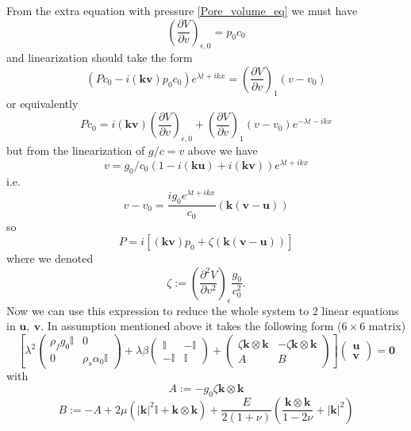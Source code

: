\documentclass[12pt]{article}
\numberwithin{theorem}{section}
\newcommand{\pp}[2]{\frac{\partial #1}{\partial #2}}
\begin{document}
From the extra equation with pressure \eqref{Pore_volume_eq} we must have
\[\left(\pp{V}{v}\right)_{\epsilon, 0} = p_0 c_0\]
and linearization should take the form
\[(Pc_0 - i(\mathbf{kv})p_0c_0)e^{\lambda t + ikx} = \left(\pp{V}{v}\right)_1 (v - v_0)\] or equivalently
\[Pc_0 = i(\mathbf{kv})\left(\pp{V}{v}\right)_{\epsilon, 0} + \left(\pp{V}{v}\right)_1 (v - v_0) e^{-\lambda t - ikx}\] 
but from the linearization of $g / c = v$ above we have
\[v = g_0/c_0 (1 - i(\mathbf{ku}) + i(\mathbf{kv}))e^{\lambda t + ikx}\]
i.e.
\[v - v_0 = \frac{ig_0e^{\lambda t + ikx}}{c_0}(\mathbf{k(v-u)})\]
so \[P = i\left[(\mathbf{kv})p_0 + \zeta (\mathbf{k(v-u)})\right]\] where we denoted \[\zeta := \left(\frac{\partial^2 V}{\partial v^2}\right)_{\epsilon} \frac{g_0}{c_0^2}.\]
Now we can use this expression to reduce the whole system to 2 linear equations in $\mathbf{u,\ v}.$ In assumption mentioned above it takes the following form ($6\times6$ matrix)
\[\left[\lambda^2\left(\begin{array}{cc}
    \rho_f g_0 \mathbb{I} & 0 \\
    0 & \rho_s \alpha_0 \mathbb{I}
\end{array}\right) +
\lambda \beta
\left(\begin{array}{cc}
    \mathbb{I} & -\mathbb{I} \\
    -\mathbb{I} & \mathbb{I}
\end{array}\right) +
\left(\begin{array}{cc}
    \zeta\mathbf{k}\otimes\mathbf{k} & -\zeta\mathbf{k}\otimes\mathbf{k} \\
    A & B
\end{array}\right)
\right]
\left(\begin{array}{cc}
    \mathbf{u} \\
    \mathbf{v}
\end{array}\right) = \mathbf{0}
\]
with 
\[A := -g_0 \zeta \mathbf{k}\otimes\mathbf{k}\]
\[B := -A + 2\mu  (|\mathbf{k}|^2\mathbb{I} + \mathbf{k}\otimes\mathbf{k}) + \frac{E}{2(1+\nu)}\left(\frac{\mathbf{k}\otimes\mathbf{k}}{1-2\nu} + |\mathbf{k}|^2\right)\]
\end{document}
